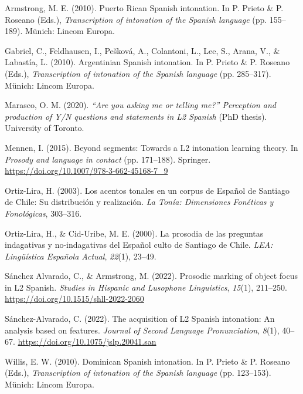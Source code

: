 \documentclass[]{article}
\newlength{\cslhangindent}
\newenvironment{CSLReferences}[2] %
 {%
  \setlength{\parindent}{0pt}
  \ifodd #1 \everypar{\setlength{\hangindent}{\cslhangindent}}\ignorespaces\fi
  \ifnum #2 > 0
  \setlength{\parskip}{#2\baselineskip}
  \fi
 }%
 {}
\begin{document}
\hypertarget{refs}{}
\begin{CSLReferences}{1}{0}
\leavevmode{}%
Armstrong, M. E. (2010). Puerto {R}ican {S}panish intonation. In P. Prieto \& P. Roseano (Eds.), \emph{Transcription of intonation of the {S}panish language} (pp. 155--189). Münich: Lincom Europa.

\leavevmode{}%
Gabriel, C., Feldhausen, I., Pešková, A., Colantoni, L., Lee, S., Arana, V., \& Labastía, L. (2010). {A}rgentinian {S}panish intonation. In P. Prieto \& P. Roseano (Eds.), \emph{Transcription of intonation of the {S}panish language} (pp. 285--317). Münich: Lincom Europa.

\leavevmode{}%
Marasco, O. M. (2020). \emph{{``Are you asking me or telling me?''} {P}erception and production of {Y/N} questions and statements in {L}2 {S}panish} (PhD thesis). University of Toronto.

\leavevmode{}%
Mennen, I. (2015). Beyond segments: {T}owards a {L}2 intonation learning theory. In \emph{Prosody and language in contact} (pp. 171--188). Springer. \url{https://doi.org/10.1007/978-3-662-45168-7_9}

\leavevmode{}%
Ortiz-Lira, H. (2003). Los acentos tonales en un corpus de {E}spañol de {Santiago de Chile}: Su distribución y realización. \emph{La Tonía: Dimensiones Fonéticas y Fonológicas}, 303--316.

\leavevmode{}%
Ortiz-Lira, H., \& Cid-Uribe, M. E. (2000). La prosodia de las preguntas indagativas y no-indagativas del {E}spañol culto de {S}antiago de {C}hile. \emph{LEA: Lingüística {E}spañola {A}ctual}, \emph{22}(1), 23--49.

\leavevmode{}%
Sánchez Alvarado, C., \& Armstrong, M. (2022). Prosodic marking of object focus in {L}2 {S}panish. \emph{Studies in Hispanic and Lusophone Linguistics}, \emph{15}(1), 211--250. \url{https://doi.org/10.1515/shll-2022-2060}

\leavevmode{}%
Sánchez-Alvarado, C. (2022). The acquisition of {L}2 {S}panish intonation: {A}n analysis based on features. \emph{Journal of Second Language Pronunciation}, \emph{8}(1), 40--67. \url{https://doi.org/10.1075/jslp.20041.san}

\leavevmode{}%
Willis, E. W. (2010). {D}ominican {S}panish intonation. In P. Prieto \& P. Roseano (Eds.), \emph{Transcription of intonation of the {S}panish language} (pp. 123--153). Münich: Lincom Europa.

\end{CSLReferences}
\end{document}
